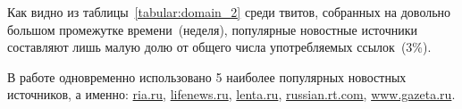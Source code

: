         Как видно из таблицы~\ref{tabular:domain_2} среди твитов, собранных на довольно большом промежутке времени~(неделя), популярные новостные источники
        составляют лишь малую долю от общего числа употребляемых ссылок~(3\%).

        В работе одновременно использовано 5 наиболее популярных новостных источников, а именно: \url{ria.ru},
        \url{lifenews.ru}, \url{lenta.ru}, \url{russian.rt.com}, \url{www.gazeta.ru}.


        \clearpage


